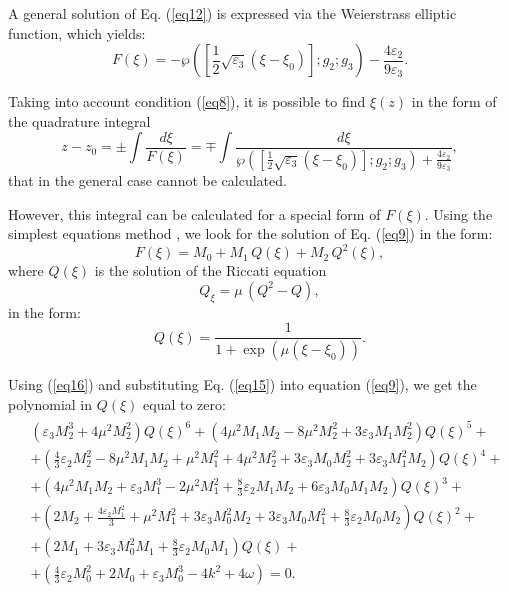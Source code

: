 \documentclass[preprint,12pt]{elsarticle}
\begin{document}
A general solution of Eq. (\ref{eq12}) is expressed via the Weierstrass elliptic function, which yields:
\begin{equation}\label{eq13}
F(\xi)=-\wp\left(\left[\frac{1}{2}\sqrt{\varepsilon_{3}}\left(\xi-\xi_{0}\right)\right];g_{2};g_{3}\right)-\frac{4 \varepsilon_{2}}{9 \varepsilon_{3}}.
\end{equation}

Taking into account condition (\ref{eq8}), it is possible to find \(\xi(z)\) in the form of the quadrature integral 
\begin{equation}
z-z_{0}=\pm\int \frac{d\xi}{F(\xi)}=\mp \int \frac{d\xi}{\wp\left(\left[\frac{1}{2}\sqrt{\varepsilon_{3}}\left(\xi-\xi_{0}\right)\right];g_{2};g_{3}\right) + \frac{4 \varepsilon_{2}}{9 \varepsilon_{3}} },
\end{equation}
that in the general case cannot be calculated. 

However, this integral can be calculated for a special form of \(F(\xi)\).
Using the simplest equations method \cite{Rad4}, we look for the solution of Eq. (\ref{eq9}) in the form:
\begin{equation} \label{eq15}
F(\xi)=M_{0}+M_{1}\,Q(\xi)+M_{2}\,Q^{2}(\xi),
\end{equation}
where \(Q(\xi)\) is the solution of the Riccati equation
\begin{equation}\label{eq16}
Q_{\xi}=\mu\,(Q^{2}-Q),
\end{equation}
in the form:
\begin{equation}
Q(\xi)=\frac{1}{1+\exp\left(\mu(\xi-\xi_{0})\right)}.
\end{equation}

Using (\ref{eq16}) and substituting Eq. (\ref{eq15}) into equation (\ref{eq9}), we get the polynomial in \(Q(\xi)\) equal to zero:
\begin{equation}
\begin{aligned}
\begin{split}
&\left(\varepsilon_{3} M_{2}^{3}+4 \mu^{2} M_{2}^{2}\right) Q(\xi)^{6}+
\left(4 \mu^{2} M_{1} M_{2}-8 \mu^{2} M_{2}^{2}+3 \varepsilon_{3} M_{1} M_{2}^{2}\right) Q(\xi)^{5}+\\
&+\left(\frac{4}{3} \varepsilon_{2} M_{2}^{2}-8 \mu^{2} M_{1} M_{2}+\mu^{2} M_{1}^{2}+4 \mu^{2} M_{2}^{2}+3 \varepsilon_{3} M_{0} M_{2}^{2}+3 \varepsilon_{3} M_{1}^{2} M_{2}\right) Q(\xi)^{4}+\\
&+\left(4 \mu^{2} M_{1} M_{2}+\varepsilon_{3} M_{1}^{3}-2 \mu^{2} M_{1}^{2}+\frac{8}{3} \varepsilon_{2} M_{1} M_{2}+6 \varepsilon_{3} M_{0} M_{1} M_{2}\right) Q(\xi)^{3}+\\
&+\left(2 M_{2}+\frac{4 \varepsilon_{2} M_{1}^{2}}{3 }+\mu^{2} M_{1}^{2}+3 \varepsilon_{3} M_{0}^{2} M_{2}+3 \varepsilon_{3} M_{0} M_{1}^{2}+\frac{8}{3 } \varepsilon_{2} M_{0} M_{2}\right) Q(\xi)^{2}+\\
&+\left(2 M_{1}+3 \varepsilon_{3} M_{0}^{2} M_{1}+\frac{8}{3} \varepsilon_{2} M_{0} M_{1}\right) Q(\xi)+\\
&+\left(\frac{4}{3} \varepsilon_{2} M_{0}^{2}+2 M_{0}+\varepsilon_{3} M_{0}^{3}-4 k^{2}+4 \omega\right)=0.
\end{split}
\end{aligned}
\end{equation}
\end{document}

